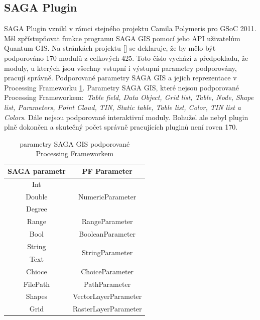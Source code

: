 \subsection{SAGA Plugin}
SAGA Plugin vznikl v rámci stejného projektu Camila Polymeris pro GSoC 2011. Měl zpřístupňovat funkce programu SAGA GIS pomocí jeho API uživatelům Quantum GIS. Na stránkách projektu [\cite{pf:supportedModules}] se deklaruje, že by mělo být podporováno 170 modulů z celkových 425. Toto číslo vychází z předpokladu, že moduly, u kterých jsou všechny vstupní i výstupní parametry podporovány, pracují správně. Podporované parametry SAGA GIS a jejich reprezentace v Processing Frameworku \ref{tab:saga_parameters}. Parametry SAGA GIS, které nejsou podporované Processing Frameworkem$:$ \textit{Table field, Data Object, Grid list, Table, Node, Shape list, Parameters, Point Cloud, TIN, Static table, Table list, Color, TIN list a Colors}. Dále nejsou podporované interaktivní moduly. Bohužel ale nebyl plugin plně dokončen a skutečný počet správně pracujících pluginů není roven 170. \\

\begin{table}[h]
	\centering
	\begin{tabular}{|c|c|}
		\hline
		\textbf{SAGA parametr} & \textbf{PF Parameter} \\
		\hline
		\hline
		Int & \multirow{3}{*}{NumericParameter}\\
		Double & \\
		Degree & \\
		\hline				
		Range & RangeParameter\\	
		\hline
		Bool & BooleanParameter\\		
		\hline
		String & \multirow{2}{*}{StringParameter}\\
		Text & \\
		\hline
		Chioce & ChoiceParameter\\
		\hline
		FilePath & PathParameter\\
		\hline
		Shapes & VectorLayerParameter\\
		\hline
		Grid & RasterLayerParameter\\		
		\hline	
	\end{tabular}
	\caption{parametry SAGA GIS podporované Processing Frameworkem}
	\label{tab:saga_parameters}
\end{table}



